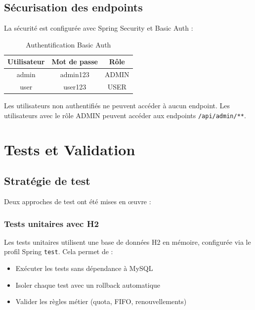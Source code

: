 \documentclass[12pt,a4paper,twoside]{report}
\begin{document}
\section{Sécurisation des endpoints}

La sécurité est configurée avec Spring Security et Basic Auth :

\begin{table}[H]
\centering
\caption{Authentification Basic Auth}
\label{tab:auth}
\begin{tabularx}{\textwidth}{c c c}
\hline
\rowcolor[gray]{0.9}
\textbf{Utilisateur} & \textbf{Mot de passe} & \textbf{Rôle} \\
\hline
admin & admin123 & ADMIN \\
user & user123 & USER \\
\hline
\end{tabularx}
\end{table}

Les utilisateurs non authentifiés ne peuvent accéder à aucun endpoint. Les utilisateurs avec le rôle ADMIN peuvent accéder aux endpoints \texttt{/api/admin/**}.

\chapter{Tests et Validation}

\section{Stratégie de test}

Deux approches de test ont été mises en œuvre :

\subsection{Tests unitaires avec H2}

Les tests unitaires utilisent une base de données H2 en mémoire, configurée via le profil Spring \texttt{test}. Cela permet de :

\begin{itemize}
    \item Exécuter les tests sans dépendance à MySQL
    \item Isoler chaque test avec un rollback automatique
    \item Valider les règles métier (quota, FIFO, renouvellements)
\end{itemize}
\end{document}
